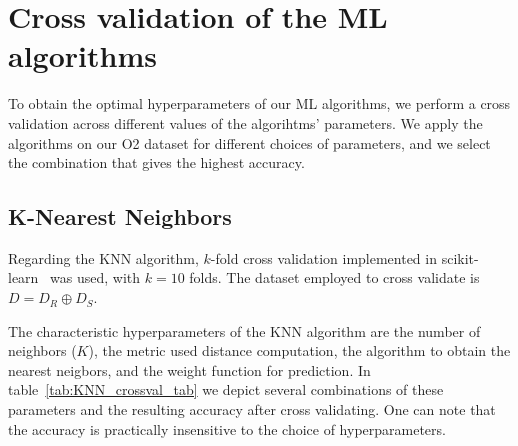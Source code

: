 \appendix

\section{Cross validation of the ML algorithms}

To obtain the optimal hyperparameters of our \ac{ML} algorithms, we perform a cross validation across different values of the algorihtms' parameters. We apply the algorithms on our O2 dataset for different choices of parameters, and we select the combination that gives the highest accuracy. 

\subsection{K-Nearest Neighbors}

Regarding the \ac{KNN} algorithm, $k$-fold cross validation implemented in scikit-learn~\cite{Pedregosa:2011ork} was used, with $k = 10$ folds.  The dataset employed to cross validate is $D=D_R\oplus D_S$. 

The characteristic hyperparameters of the \ac{KNN} algorithm are the number of neighbors ($K$), the metric used distance computation, the algorithm to obtain the nearest neigbors, and the weight function for prediction. In table~\ref{tab:KNN_crossval_tab} we depict several combinations of these parameters and the resulting accuracy after cross validating. One can note that the accuracy is practically insensitive to the choice of hyperparameters.


